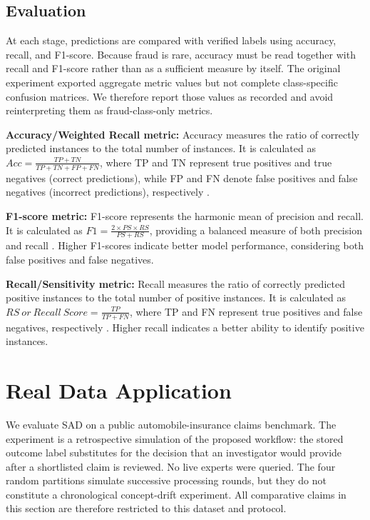 \documentclass[12pt]{article}
\begin{document}
\subsection{Evaluation}\label{SSC:EVAL}
At each stage, predictions are compared with verified labels using accuracy,
recall, and F1-score. Because fraud is rare, accuracy must be read together
with recall and F1-score rather than as a sufficient measure by itself. The
original experiment exported aggregate metric values but not complete
class-specific confusion matrices. We therefore report those values as
recorded and avoid reinterpreting them as fraud-class-only metrics.

\textbf{\small Accuracy/Weighted Recall metric:} Accuracy measures
the ratio of correctly predicted instances to the total number of
instances. It is calculated as $Acc=\frac{TP+TN}{TP+TN+FP+FN}$,
where TP and TN represent true positives and true negatives
(correct predictions), while FP and FN denote false positives and
false negatives (incorrect predictions), respectively \cite{A3}.

\textbf{\small F1-score  metric:} F1-score represents the harmonic
mean of precision and recall. It is calculated as
$F1=\frac{2\times P S\times R S}{PS+RS}$, providing a balanced
measure of both precision and recall \cite{A3}. Higher
F1-scores indicate better model performance, considering both
false positives and false negatives.

    \textbf{Recall/Sensitivity  metric:} Recall measures the ratio of correctly predicted positive
instances to the total number of positive instances. It is
calculated as $RS\ or\ Recall\ Score=\frac{TP}{TP+FN}$, where TP
and FN represent true positives and false negatives, respectively
\cite{A3}. Higher recall indicates a better
ability to identify positive instances.


\section{Real Data Application}\label{SC:RESULT}
We evaluate SAD on a public automobile-insurance claims benchmark. The
experiment is a retrospective simulation of the proposed workflow: the stored
outcome label substitutes for the decision that an investigator would provide
after a shortlisted claim is reviewed. No live experts were queried. The four
random partitions simulate successive processing rounds, but they do not
constitute a chronological concept-drift experiment. All comparative claims in
this section are therefore restricted to this dataset and protocol.
\end{document}

